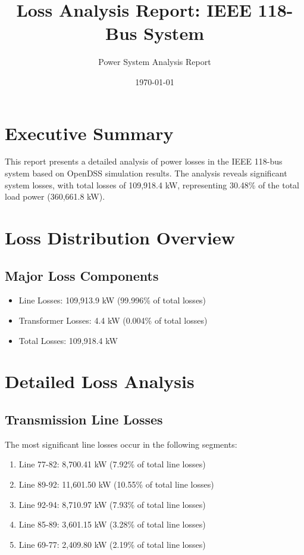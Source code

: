 \documentclass[11pt]{article}
\title{Loss Analysis Report: IEEE 118-Bus System}
\author{Power System Analysis Report}
\date{\today}
\begin{document}
\maketitle

\section{Executive Summary}
This report presents a detailed analysis of power losses in the IEEE 118-bus system based on OpenDSS simulation results. The analysis reveals significant system losses, with total losses of 109,918.4 kW, representing 30.48\% of the total load power (360,661.8 kW).

\section{Loss Distribution Overview}
\subsection{Major Loss Components}
\begin{itemize}
    \item Line Losses: 109,913.9 kW (99.996\% of total losses)
    \item Transformer Losses: 4.4 kW (0.004\% of total losses)
    \item Total Losses: 109,918.4 kW
\end{itemize}

\section{Detailed Loss Analysis}

\subsection{Transmission Line Losses}
The most significant line losses occur in the following segments:
\begin{enumerate}
    \item Line 77-82: 8,700.41 kW (7.92\% of total line losses)
    \item Line 89-92: 11,601.50 kW (10.55\% of total line losses)
    \item Line 92-94: 8,710.97 kW (7.93\% of total line losses)
    \item Line 85-89: 3,601.15 kW (3.28\% of total line losses)
    \item Line 69-77: 2,409.80 kW (2.19\% of total line losses)
\end{enumerate}
\end{document}
